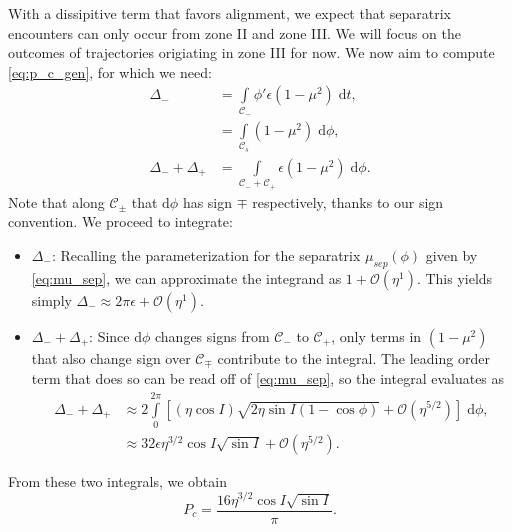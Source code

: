 \documentclass[
        fleqn,
        usenatbib,
    ]{mnras}
\newcommand*{\p}[1]{\left(#1\right)}
\newcommand*{\s}[1]{\left[#1\right]}
\begin{document}
With a dissipitive term that favors alignment, we expect that separatrix
encounters can only occur from zone II and zone III\@. We will focus on the
outcomes of trajectories origiating in zone III for now. We now aim to compute
\autoref{eq:p_c_gen}, for which we need:
\begin{subequations}
    \begin{align}
        \Delta_- &= \int\limits_{\mathcal{C}_-}
                \phi'\epsilon\p{1 - \mu^2}\;\mathrm{d}t,\nonumber\\
            &= \int\limits_{\mathcal{C}_s}
                \p{1 - \mu^2}\;\mathrm{d}\phi,\\
        \Delta_- + \Delta_+ &= \int\limits_{\mathcal{C}_- + \mathcal{C}_+}
            \epsilon\p{1 - \mu^2}\;\mathrm{d}\phi.
    \end{align}
\end{subequations}
Note that along $\mathcal{C}_{\pm}$ that $\mathrm{d}\phi$ has sign $\mp$
respectively, thanks to our sign convention. We proceed to integrate:
\begin{itemize}
    \item $\Delta_-$: Recalling the parameterization for the separatrix
        $\mu_{sep}(\phi)$ given by \autoref{eq:mu_sep}, we can approximate the
        integrand as $1 + \mathcal{O}(\eta^1)$. This yields simply $\Delta_-
        \approx 2\pi \epsilon + \mathcal{O}(\eta^1)$.

    \item $\Delta_- + \Delta_+$: Since $\mathrm{d}\phi$ changes signs from
        $\mathcal{C}_-$ to $\mathcal{C}_+$, only terms in $(1 - \mu^2)$ that
        also change sign over $\mathcal{C}_{\mp}$ contribute to the integral.
        The leading order term that does so can be read off of
        \autoref{eq:mu_sep}, so the integral evaluates as
        \begin{align}
            \Delta_- + \Delta_+ &\approx
                2\int\limits_0^{2\pi}
                    \s{(\eta \cos I) \sqrt{2\eta \sin I(1 - \cos \phi)}
                        + \mathcal{O}(\eta^{5/2})} \;\mathrm{d}\phi,\\
                &\approx 32\epsilon \eta^{3/2} \cos I \sqrt{\sin I}
                    + \mathcal{O}(\eta^{5/2}).
        \end{align}
\end{itemize}
From these two integrals, we obtain
\begin{equation}
    P_c = \frac{16\eta^{3/2}\cos I \sqrt{\sin I}}{\pi}.\label{eq:p1pc}
\end{equation}
\end{document}
